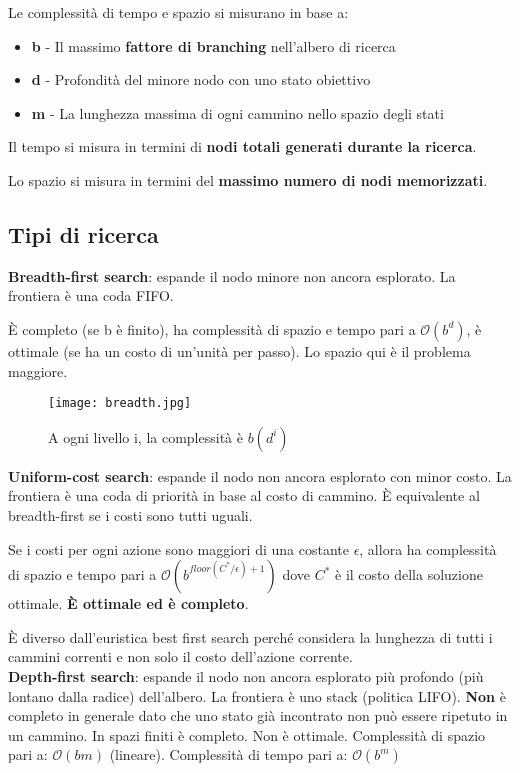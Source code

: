Le complessità di tempo e spazio si misurano in base a:

\begin{itemize}
\item \textbf{b} - Il massimo \textbf{fattore di branching} nell'albero di
ricerca
\item \textbf{d} - Profondità del minore nodo con uno stato obiettivo
\item \textbf{m} - La lunghezza massima di ogni cammino nello spazio degli
stati
\end{itemize}

Il tempo si misura in termini di \textbf{nodi totali generati durante la
ricerca}.

Lo spazio si misura in termini del \textbf{massimo numero di nodi
memorizzati}.\\

\subsection{Tipi di ricerca}

\textbf{Breadth-first search}: espande il nodo minore non ancora esplorato.
La frontiera è una coda FIFO.

È completo (se b è finito), ha complessità di spazio e tempo pari a
$\mathcal{O}(b^d)$, è ottimale (se ha un costo di un'unità per passo).
Lo spazio qui è il problema maggiore.\\

\begin{figure}[H]
\centering
\texttt{[image: breadth.jpg]}
\caption{A ogni livello i, la complessità è $b(d^i)$}
\label{fig:breadth}
\end{figure}

\textbf{Uniform-cost search}: espande il nodo non ancora esplorato con minor costo.
La frontiera è una coda di priorità in base al costo di cammino.
È equivalente al breadth-first se i costi sono tutti uguali.

Se i costi per ogni azione sono maggiori di una costante $\epsilon$, allora ha
complessità di spazio e tempo pari a $\mathcal{O}(b^{floor(C^*/\epsilon)+1})$
dove $C^*$ è il costo della soluzione ottimale.
\textbf{È ottimale ed è completo}.

È diverso dall'euristica best first search perché considera la lunghezza di
tutti i cammini correnti e non solo il costo dell'azione corrente.\\

\textbf{Depth-first search}: espande il nodo non ancora esplorato più profondo
(più lontano dalla radice) dell'albero. La frontiera è uno stack (politica LIFO).
\textbf{Non} è completo in generale dato che uno stato già incontrato non può
essere ripetuto in un cammino. In spazi finiti è completo. Non è ottimale.
Complessità di spazio pari a: $\mathcal{O}(bm)$ (lineare).
Complessità di tempo pari a: $\mathcal{O}(b^m)$\\

